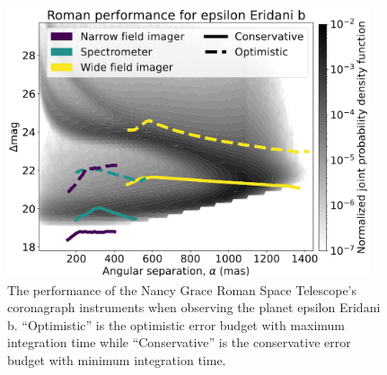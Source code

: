 \begin{figure}
  \begin{center}
    \includegraphics[width=0.95\textwidth]{ch2/figures/RST_performance_flipped.png}
  \end{center}
  \caption{The performance of the Nancy Grace Roman Space Telescope's coronagraph
    instruments when observing the planet epsilon Eridani b. ``Optimistic'' is the
  optimistic error budget with maximum integration time while ``Conservative''
  is the conservative error budget with minimum integration time.}
  \label{fig:RST_performance_flipped}
\end{figure}

